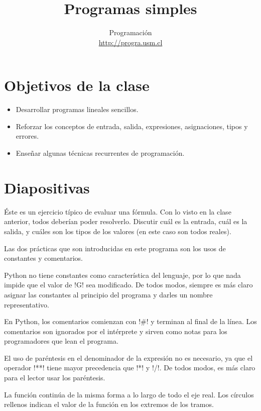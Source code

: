 \documentclass[10pt]{article}
\title{Programas simples}
\author{Programación \\ \url{http://progra.usm.cl}}
\date{}
\begin{document}
  \maketitle

  \section*{Objetivos de la clase}
  \begin{itemize}
    \item Desarrollar programas lineales sencillos.
    \item Reforzar los conceptos de
      entrada, salida, expresiones, asignaciones, tipos y errores.
    \item Enseñar algunas técnicas recurrentes de programación.
  \end{itemize}

  \section*{Diapositivas}


  Éste es un ejercicio típico de evaluar una fórmula.
  Con lo visto en la clase anterior,
  todos deberían poder resolverlo.
  Discutir cuál es la entrada, cuál es la salida,
  y cuáles son los tipos de los valores
  (en este caso son todos reales).


  Las dos prácticas que son introducidas en este programa son
  los usos de constantes y comentarios.

  Python no tiene constantes como característica del lenguaje,
  por lo que nada impide que el valor de \li!G! sea modificado.
  De todos modos,
  siempre es más claro asignar las constantes al principio del programa
  y darles un nombre representativo.

  En Python,
  los comentarios comienzan con \li!#! y terminan al final de la línea.
  Los comentarios son ignorados por el intérprete
  y sirven como notas para los programadores que lean el programa.

  El uso de paréntesis en el denominador de la expresión
  no es necesario, ya que el operador \li!**! tiene mayor precedencia
  que \li!*! y \li!/!. De todos modos, es más claro para el lector
  usar los paréntesis.


  La función continúa de la misma forma a lo largo de todo el eje real.
  Los círculos rellenos indican el valor de la función en los extremos de los tramos.
\end{document}
